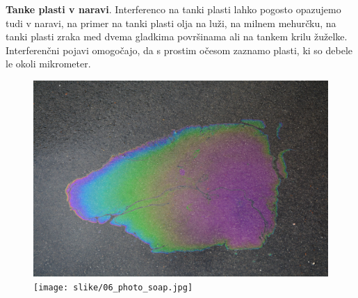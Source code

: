 \begin{example}{\bf Tanke plasti v naravi}.
Interferenco na tanki plasti lahko pogosto opazujemo tudi v naravi, na primer
na tanki plasti olja na luži, na milnem mehurčku, na tanki plasti zraka med 
dvema gladkima površinama ali na tankem krilu žuželke. 
Interferenčni pojavi omogočajo, da s prostim očesom zaznamo plasti, ki so 
debele le okoli mikrometer.
\begin{figure}[!ht]
\centering
\includegraphics[width=7truecm]{slike/06_photo_oil.jpg}\hfill
\texttt{[image: slike/06\_photo\_soap.jpg]}\newline


\end{figure}
\end{example}

